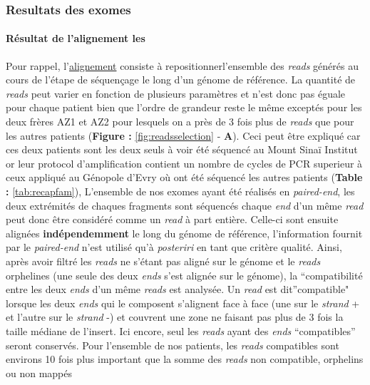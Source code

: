 \documentclass[12pt,twoside]{reedthesis}
\theoremstyle{definition}
\theoremstyle{definition}
\theoremstyle{remark}
\begin{document}
  \subsubsection{Resultats des exomes}\label{resultats-des-exomes}
  
  \paragraph{Résultat de l'alignement
  les}\label{resultat-de-lalignement-les}
  
  Pour rappel, l'\href{\%7B\#lalignement\%7D}{alignement} consiste à
  repositionnerl'ensemble des \emph{reads} générés au cours de l'étape de
  séquençage le long d'un génome de référence. La quantité de \emph{reads}
  peut varier en fonction de plusieurs paramètres et n'est donc pas éguale
  pour chaque patient bien que l'ordre de grandeur reste le même exceptés
  pour les deux frères AZ1 et AZ2 pour lesquels on a près de 3 fois plus
  de \emph{reads} que pour les autres patients (\textbf{Figure :
  }\ref{fig:readsselection} - \textbf{A}). Ceci peut être expliqué car ces
  deux patients sont les deux seuls à voir été séquencé au Mount Sinaï
  Institut or leur protocol d'amplification contient un nombre de cycles
  de PCR superieur à ceux appliqué au Génopole d'Evry où ont été séquencé
  les autres patients (\textbf{Table :} \ref{tab:recapfam}), L'ensemble de
  nos exomes ayant été réalisés en \emph{paired-end}, les deux extrémités
  de chaques fragments sont séquencés chaque \emph{end} d'un même
  \emph{read} peut donc être considéré comme un \emph{read} à part
  entière. Celle-ci sont ensuite alignées \textbf{indépendemment} le long
  du génome de référence, l'information fournit par le \emph{paired-end}
  n'est utilisé qu'à \emph{posteriri} en tant que critère qualité. Ainsi,
  après avoir filtré les \emph{reads} ne s'étant pas aligné sur le génome
  et le \emph{reads} orphelines (une seule des deux \emph{ends} s'est
  alignée sur le génome), la ``compatibilité entre les deux \emph{ends}
  d'un même \emph{reads} est analysée. Un \emph{read} est dit''compatible"
  lorsque les deux \emph{ends} qui le composent s'alignent face à face
  (une sur le \emph{strand} + et l'autre sur le \emph{strand} -) et
  couvrent une zone ne faisant pas plus de 3 fois la taille médiane de
  l'insert. Ici encore, seul les \emph{reads} ayant des \emph{ends}
  ``compatibles'' seront conservés. Pour l'ensemble de nos patients, les
  \emph{reads} compatibles sont environs 10 fois plus important que la
  somme des \emph{reads} non compatible, orphelins ou non mappés
\end{document}
